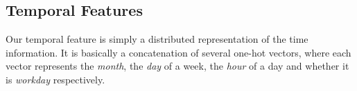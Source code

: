 \subsection{Temporal Features}
Our temporal feature is simply a distributed representation of the time information.
It is basically a concatenation of several one-hot vectors, 
where each vector represents the \textit{month}, the \textit{day} of a week, the \textit{hour} of a day and whether it is \textit{workday} respectively. 

